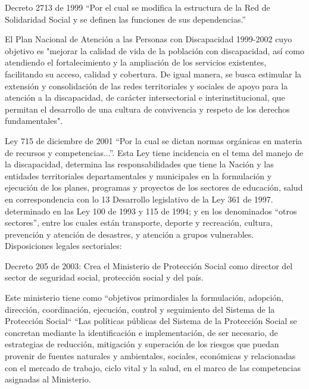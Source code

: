 \documentclass[a4paper, 12pt, oneside]{article}
\begin{document}
	Decreto 2713 de 1999  “Por el cual se modifica la estructura de la Red de Solidaridad Social y se definen las funciones de sus dependencias.”

	El Plan Nacional de Atención a las Personas con Discapacidad 1999-2002 cuyo objetivo es "mejorar la calidad de vida de la población con discapacidad, así como atendiendo el fortalecimiento y la ampliación de los servicios existentes, facilitando su acceso, calidad y cobertura. De igual manera, se busca estimular la extensión y consolidación de las redes territoriales y sociales de apoyo para la atención a la discapacidad, de carácter intersectorial e interinstitucional, que permitan el desarrollo de una cultura de convivencia y respeto de los derechos fundamentales".

	Ley 715 de diciembre de 2001 “Por la cual se dictan normas orgánicas en materia de recursos y competencias...”. Esta Ley tiene incidencia en el tema del manejo de la discapacidad, determina las responsabilidades que tiene la Nación y las entidades territoriales departamentales y municipales en la formulación y ejecución de los planes, programas y proyectos de los sectores de educación, salud en correspondencia con lo 13 Desarrollo legislativo de la Ley 361 de 1997. determinado en las Ley 100 de 1993 y 115 de 1994; y en los denominados “otros sectores”, entre los cuales están transporte, deporte y recreación, cultura, prevención y atención de desastres, y atención a grupos vulnerables.
	Disposiciones legales sectoriales:

	Decreto 205 de 2003: Crea el Ministerio de Protección Social como director del sector de seguridad social, protección social y del país.

	Este ministerio tiene como “objetivos primordiales la formulación, adopción, dirección, coordinación, ejecución, control y seguimiento del Sistema de la Protección Social“ “Las políticas públicas del Sistema de la Protección Social se concretan mediante la identificación e implementación, de ser necesario, de estrategias de reducción, mitigación y superación de los riesgos que puedan provenir de fuentes naturales y ambientales, sociales, económicas y relacionadas con el mercado de trabajo, ciclo vital y la salud, en el marco de las competencias asignadas al Ministerio.
\end{document}
